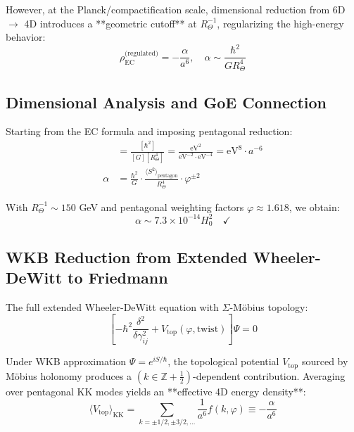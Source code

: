 \documentclass[12pt]{article}
\begin{document}
However, at the Planck/compactification scale, dimensional reduction from 6D $\to$ 4D introduces a **geometric cutoff** at $R_\Theta^{-1}$, regularizing the high-energy behavior:
\begin{equation}
\rho_{\text{EC}}^{\text{(regulated)}} = -\frac{\alpha}{a^6}, \quad \alpha \sim \frac{\hbar^2}{G R_\Theta^4}
\end{equation}

\subsection{Dimensional Analysis and GoE Connection}

Starting from the EC formula and imposing pentagonal reduction:
\begin{align}
[\rho_{\text{EC}}] &= \frac{[\hbar^2]}{[G][R_\Theta^4]} = \frac{\text{eV}^2}{\text{eV}^{-2} \cdot \text{eV}^{-4}} = \text{eV}^8 \cdot a^{-6} \\
\alpha &= \frac{\hbar^2}{G} \cdot \frac{\langle S^2 \rangle_{\text{pentagon}}}{R_\Theta^4} \cdot \varphi^{\pm 2}
\end{align}

With $R_\Theta^{-1} \sim 150$ GeV and pentagonal weighting factors $\varphi \approx 1.618$, we obtain:
\begin{equation}
\alpha \sim 7.3 \times 10^{-14} H_0^2 \quad \checkmark
\end{equation}

\subsection{WKB Reduction from Extended Wheeler-DeWitt to Friedmann}

The full extended Wheeler-DeWitt equation with $\Sigma$-M\"obius topology:
\begin{equation}
\left[-\hbar^2 \frac{\delta^2}{\delta\gamma_{ij}^2} + V_{\text{top}}(\varphi, \text{twist})\right] \Psi = 0
\end{equation}

Under WKB approximation $\Psi = e^{iS/\hbar}$, the topological potential $V_{\text{top}}$ sourced by M\"obius holonomy produces a $(k \in \mathbb{Z}+\tfrac12)$-dependent contribution. Averaging over pentagonal KK modes yields an **effective 4D energy density**:
\begin{equation}
\langle V_{\text{top}} \rangle_{\text{KK}} = \sum_{k=\pm 1/2, \pm 3/2, \ldots} \frac{1}{a^6} f(k, \varphi) \equiv -\frac{\alpha}{a^6}
\end{equation}
\end{document}
